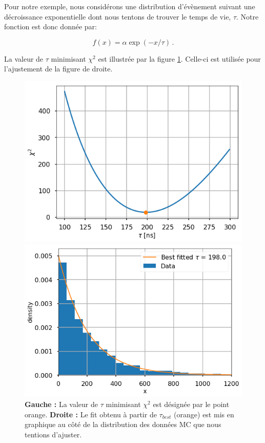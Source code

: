 Pour notre exemple, nous considérons une distribution d'évènement suivant une décroissance exponentielle dont nous tentons de trouver le temps de vie, $\tau$. Notre fonction est donc donnée par:

\begin{equation}
f(x) = \alpha \exp(-x / \tau) \, .
\end{equation}

La valeur de $\tau$ minimisant $\chi^2$ est illustrée par la figure \ref{fig:chi2}. Celle-ci est utilisée pour l'ajustement de la figure de droite.

\begin{figure}[h!]
    \centering
    \begin{minipage}[b]{0.48\linewidth}
    \includegraphics[width=\linewidth]{figures/chi_2.png}
    \end{minipage}
    \hfill
    \begin{minipage}[b]{0.51\linewidth}
    \includegraphics[width=\linewidth]{figures/chi_2_bestfit.png}
    \end{minipage}
    \caption{\textbf{Gauche :} La valeur de $\tau$ minimisant $\chi^2$ est désignée par le point orange. \textbf{Droite :} Le fit obtenu à partir de $\tau_{best}$ (orange) est mis en graphique au côté de la distribution des données MC que nous tentions d'ajuster.}
    \label{fig:chi2}
\end{figure}

